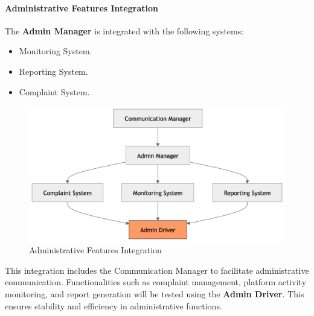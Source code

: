 \paragraph{Administrative Features Integration}
The \textbf{Admin Manager} is integrated with the following systems:
\begin{itemize}
    \item Monitoring System.
    \item Reporting System.
    \item Complaint System.
\end{itemize}
\begin{figure}[H]
    \begin{center}
      \includegraphics[width=0.59\linewidth]{JhaBhatiaSharma/imagesDD/AdministrativeFeaturesIntegration.png}
        \caption{Administrative Features Integration}
        \label{fig:adminstrativefeatures}
    \end{center}
\end{figure}
This integration includes the Communication Manager to facilitate administrative communication. Functionalities such as complaint management, platform activity monitoring, and report generation will be tested using the \textbf{Admin Driver}. This ensures stability and efficiency in administrative functions.


